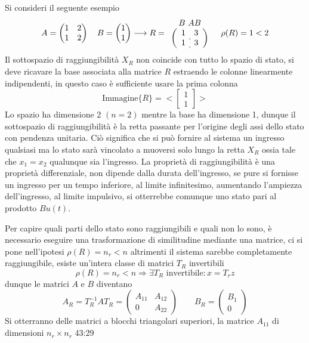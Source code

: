 Si consideri il seguente esempio
$$
A = \begin{pmatrix}
     1 & 2 \\
     1 & 2
    \end{pmatrix}
\quad B = \begin{pmatrix}
           1 \\ 1
          \end{pmatrix} \longrightarrow
R=
\begin{array}{c}
B \ AB \\
\left(\begin{array}{c:c}
    1 & 3 \\
    1 & 3
   \end{array}\right)
\end{array}\quad
\rho(R) = 1 < 2
$$
Il sottospazio di raggiungibilità $X_R$ non coincide con tutto lo spazio di
stato, si deve ricavare la base associata alla matrice $R$ estraendo le colonne
linearmente indipendenti, in questo caso è sufficiente usare la prima colonna
$$
\text{Immagine}\{R\} = <\begin{bmatrix}
                         1 \\ 1
                        \end{bmatrix}>
$$
Lo spazio ha dimensione 2 $(n=2)$ mentre la base ha dimensione 1, dunque il
sottospazio di raggiungibilità è la retta passante per l'origine degli assi
dello stato con pendenza unitaria.
Ciò significa che si può fornire al sistema un ingresso qualsiasi ma lo stato
sarà vincolato a muoversi solo lungo la retta $X_R$ ossia tale che $x_1=x_2$
qualunque sia l'ingresso.
La proprietà di raggiungibilità è una proprietà differenziale, non dipende
dalla durata dell'ingresso, se pure si fornisse un ingresso per un tempo
inferiore, al limite infinitesimo, aumentando l'ampiezza dell'ingresso, al
limite impulsivo, si otterrebbe comunque uno stato pari al prodotto $Bu(t)$.

Per capire quali parti dello stato sono raggiungibili e quali non lo sono,
è necessario eseguire una trasformazione di similitudine mediante una matrice,
ci si pone nell'ipotesi $\rho(R) = n_r<n$ altrimenti il sistema sarebbe
completamente raggiungibile, esiste un'intera classe di matrici $T_R$
invertibili
$$
\rho(R) = n_r<n \Rightarrow \exists T_R \text{ invertibile} : x=T_rz
$$
dunque le matrici $A$ e $B$ diventano
$$
A_R = T_R^{-1} A T_R = \begin{pmatrix}
                        A_{11} & A_{12} \\
                        0 & A_{22}
                       \end{pmatrix}
\qquad
B_R = \begin{pmatrix}
       B_1 \\ 0
      \end{pmatrix}
$$
Si otterranno delle matrici a blocchi triangolari superiori, la matrice
$A_{11}$ di dimensioni $n_r \times n_r$
43:29
